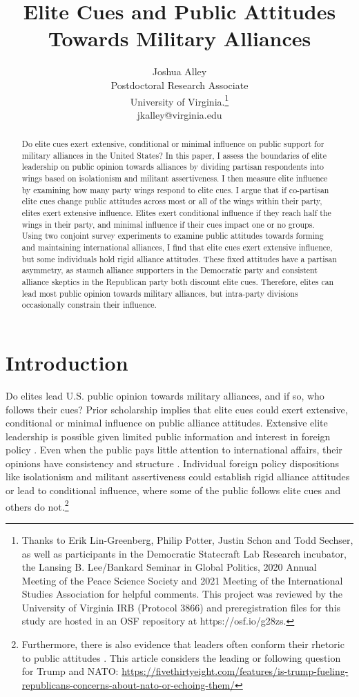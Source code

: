 \documentclass[12pt]{article}
\title{\textbf{Elite Cues and Public Attitudes Towards Military Alliances}}
\author{Joshua Alley \\
Postdoctoral Research Associate \\
University of Virginia.\thanks{Thanks to Erik Lin-Greenberg, Philip Potter, Justin Schon and Todd Sechser, as well as participants in the Democratic Statecraft Lab Research incubator, the Lansing B. Lee/Bankard Seminar in Global Politics, 2020 Annual Meeting of the Peace Science Society and 2021 Meeting of the International Studies Association for helpful comments. 
This project was reviewed by the University of Virginia IRB (Protocol 3866) and preregistration files for this study are hosted in an OSF repository at https://osf.io/g28zs.} \\
jkalley@virginia.edu
}
\date{}
\begin{document}
\maketitle 

\doublespace 

\begin{abstract}
Do elite cues exert extensive, conditional or minimal influence on public support for military alliances in the United States? 
In this paper, I assess the boundaries of elite leadership on public opinion towards alliances by dividing partisan respondents into wings based on isolationism and militant assertiveness.
I then measure elite influence by examining how many party wings respond to elite cues. 
I argue that if co-partisan elite cues change public attitudes across most or all of the wings within their party, elites exert extensive influence. 
Elites exert conditional influence if they reach half the wings in their party, and minimal influence if their cues impact one or no groups.
Using two conjoint survey experiments to examine public attitudes towards forming and maintaining international alliances, I find that elite cues exert extensive influence, but some individuals hold rigid alliance attitudes. 
These fixed attitudes have a partisan asymmetry, as staunch alliance supporters in the Democratic party and consistent alliance skeptics in the Republican party both discount elite cues.  
Therefore, elites can lead most public opinion towards military alliances, but intra-party divisions occasionally constrain their influence.  
\end{abstract}


\newpage 


\section{Introduction}


Do elites lead U.S. public opinion towards military alliances, and if so, who follows their cues?
Prior scholarship implies that elite cues could exert extensive, conditional or minimal influence on public alliance attitudes.
Extensive elite leadership is possible given limited public information and interest in foreign policy \citep{Canes-Wrone2006, BaumPotter2008, Druckman2014}.
Even when the public pays little attention to international affairs, their opinions have consistency and structure \citep{Holsti1992, PageShapiro1992}.
Individual foreign policy dispositions like isolationism and militant assertiveness \citep{Herrmannetal1999, KertzerZeitzoff2017} could establish rigid alliance attitudes or lead to conditional influence, where some of the public follows elite cues and others do not.\footnote{Furthermore, there is also evidence that leaders often conform their rhetoric to public attitudes \citep{Barberaetal2019, HagerHilbig2020}. This article considers the leading or following question for Trump and NATO: \url{https://fivethirtyeight.com/features/is-trump-fueling-republicans-concerns-about-nato-or-echoing-them/}}
\end{document}
